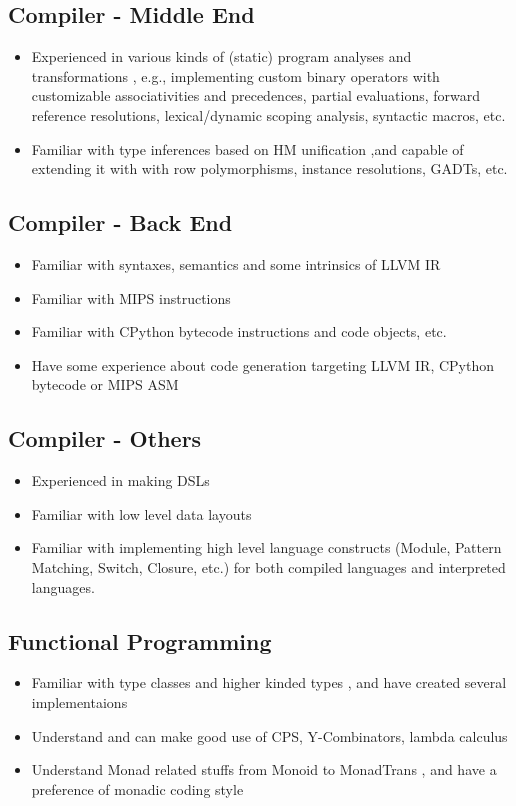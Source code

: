 \documentclass{resume}
\begin{document}
\subsection{\textbf{Compiler - Middle End}}
\begin{itemize}
  \item Experienced in various kinds of (static) program analyses and transformations
        , e.g.,
          implementing custom binary operators with customizable associativities and precedences,
          partial evaluations, forward reference resolutions, lexical/dynamic scoping analysis, syntactic macros, etc.
  \item Familiar with type inferences based on HM unification
      ,and capable of extending it with
       with row polymorphisms, instance resolutions, GADTs, etc.
\end{itemize}

\subsection{\textbf{Compiler - Back End}}
\begin{itemize}
  \item Familiar with syntaxes, semantics and some intrinsics of LLVM IR
  \item Familiar with MIPS instructions
  \item Familiar with CPython bytecode instructions and code objects, etc.
  \item Have some experience about code generation targeting LLVM IR, CPython bytecode or MIPS ASM
\end{itemize}

\subsection{\textbf{Compiler - Others}}
\begin{itemize}
  \item Experienced in making DSLs
  \item Familiar with low level data layouts
  \item Familiar with implementing high level language constructs
        (Module, Pattern Matching, Switch, Closure, etc.) for both
        compiled languages and interpreted languages.
\end{itemize}

\subsection{\textbf{Functional Programming}}
\begin{itemize}
  \item Familiar with type classes and higher kinded types
        , and have created several implementaions
  \item Understand and can make good use of CPS, Y-Combinators, lambda calculus
  \item Understand Monad related stuffs from Monoid to MonadTrans
        , and have a preference of monadic coding style
\end{itemize}
\end{document}
